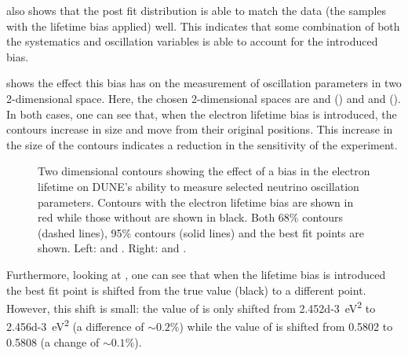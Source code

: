  also shows that the post fit distribution is able to match the data (the samples with the lifetime bias applied) well. 
This indicates that some combination of both the systematics and oscillation variables is able to account for the introduced bias.

 shows the effect this bias has on the measurement of oscillation parameters in two 2-dimensional space. 
Here, the chosen 2-dimensional spaces are  and  () and  and \dcp ().
In both cases, one can see that, when the electron lifetime bias is introduced, the contours increase in size and move from their original positions.
This increase in the size of the contours indicates a reduction in the sensitivity of the experiment.

\begin{figure}[h]
	\begin{minipage}[t]{.5\linewidth}
		\begin{adjustbox}{max totalsize=\linewidth, center}
			
		\end{adjustbox}
	\end{minipage}
	\hfill
	\begin{minipage}[t]{.5\linewidth}
		\begin{adjustbox}{max totalsize=\linewidth, center}
			
		\end{adjustbox}
	\end{minipage}
	\caption[2D contours showing the effect of an electron lifetime bias on the measurement of neutrino oscillation parameters]{Two dimensional contours showing the effect of a bias in the electron lifetime on DUNE's ability to measure selected neutrino oscillation parameters. Contours with the electron lifetime bias are shown in red while those without are shown in black. Both 68\% contours (dashed lines), 95\% contours (solid lines) and the best fit points are shown. Left:  and . Right:  and \dcp. }
	\label{fig:2dContoursHighStats}
\end{figure}

Furthermore, looking at , one can see that when the lifetime bias is introduced the best fit point is shifted from the true value (black) to a different point.
However, this shift is small: the value of  is only shifted from \SI{2.452d-3}{\eV\squared} to \SI{2.456d-3}{\eV\squared} (a difference of $\sim 0.2\%$) while the value of  is shifted from 0.5802 to 0.5808 (a change of $\sim 0.1\%$).

